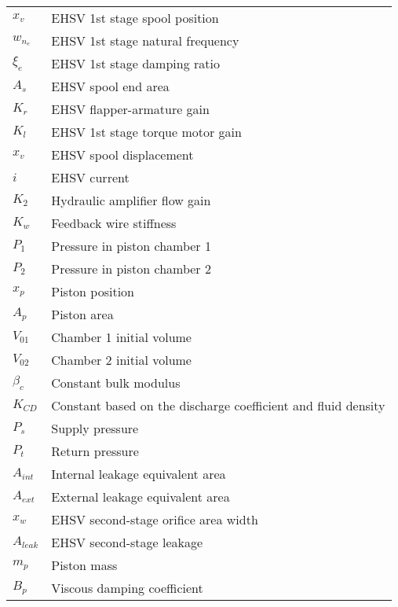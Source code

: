 \begin{longtable}{ll}
		
	$x_v$		& EHSV 1st stage spool position			\\
	$w_{n_e}$	& EHSV 1st stage natural frequency		\\
	$\xi_{e}$	& EHSV 1st stage damping ratio			\\
	$A_s$		& EHSV spool end area					\\
	$K_r$		& EHSV flapper-armature gain			\\
	$K_l$		& EHSV 1st stage torque motor gain		\\
	$x_v$		& EHSV spool displacement				\\
	$i$			& EHSV current							\\
	$K_2$		& Hydraulic amplifier flow gain			\\
	$K_w$		& Feedback wire stiffness				\\
	$P_1$		& Pressure in piston chamber 1			\\
	$P_2$		& Pressure in piston chamber 2			\\
	$x_p$		& Piston position						\\
	$A_p$		& Piston area							\\
	$V_{01}$	& Chamber 1 initial volume				\\
	$V_{02}$	& Chamber 2 initial volume				\\
	$\beta_c$	& Constant bulk modulus					\\
	$K_{CD}$	& Constant based on the discharge coefficient and fluid density \\
	$P_s$		& Supply pressure						\\
	$P_t$		& Return pressure						\\
	$A_{int}$	& Internal leakage equivalent area		\\
	$A_{ext}$	& External leakage equivalent area		\\
	$x_{w}$		& EHSV second-stage orifice area width 	\\
	$A_{leak}$	& EHSV second-stage leakage				\\
	$m_p$		& Piston mass							\\
	$B_p$		& Viscous damping coefficient			\\
	
\end{longtable}